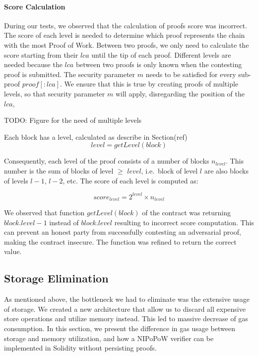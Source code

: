 

\bigbreak
\paragraph{Score Calculation}

During our tests, we observed that the calculation of proofs score was
incorrect. The score of each level is needed to determine which proof
represents the chain with the most Proof of Work. Between two proofs, we only
need to calculate the score starting from their $lca$ until the tip of each
proof. Different levels are needed because the $lca$ between two proofs is only
known when the contesting proof is submitted. The security parameter $m$ needs
to be satisfied for every sub-proof $proof[:lca]$. We ensure that this is true
by creating proofs of multiple levels, so that security parameter $m$ will
apply, disregarding the position of the $lca$,

TODO: Figure for the need of multiple levels

Each block has a level, calculated as describe in Section(ref)
\[ level = getLevel(block) \]

Consequently, each level of the proof consists of a number of blocks
$n_{level}$. This number is the sum of blocks of level $\geq$ $level$, i.e.\
block of level $l$ are also blocks of levels $l-1$, $l-2$, etc. The
score of each level is computed as:

\[score_{level} = 2^{level} \times n_{level}\]

We observed that function $getLevel(block)$ of the contract was returning
$block.level-1$ instead of $block.level$ resulting to incorrect score
computation. This can prevent an honest party from successfully contesting an
adversarial proof, making the contract insecure. The function was refined to
return the correct value.

\subsection{Storage Elimination}

As mentioned above, the bottleneck we had to eliminate was the extensive usage
of storage. We created a new architecture that allow us to discard all
expensive store operations and utilize memory instead. This led to massive
decrease of gas consumption. In this section, we present the difference in gas
usage between storage and memory utilization, and how a NIPoPoW verifier can be
implemented in Solidity without persisting proofs.


